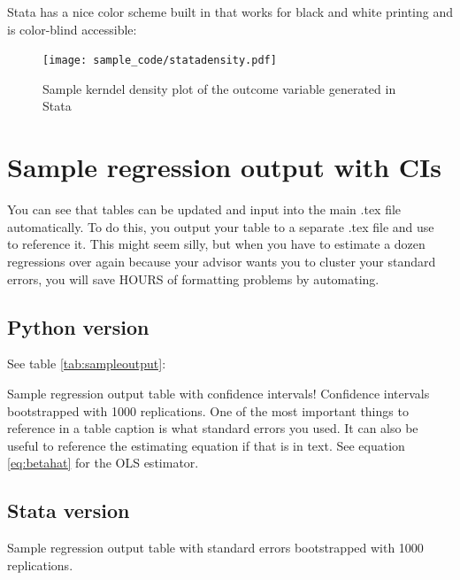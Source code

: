 \documentclass{article}
\begin{document}
Stata has a nice color scheme built in that works for black and white printing and is color-blind accessible:

\begin{figure}[ht]
    \centering
    \texttt{[image: sample\_code/statadensity.pdf]}
    \caption{Sample kerndel density plot of the outcome variable generated in Stata}
    \label{fig:statahist}
\end{figure}

\section{Sample regression output with CIs}
You can see that tables can be updated and input into the main .tex file automatically.  To do this, you output your table to a separate .tex file and use \verb!  ! to reference it.  This might seem silly, but when you have to estimate a dozen regressions over again because your advisor wants you to cluster your standard errors, you will save HOURS of formatting problems by automating.

\subsection{Python version}

See table \ref{tab:sampleoutput}:

\begin{table}[ht]
    \centering
    
    \caption{Sample regression output table with confidence intervals! Confidence intervals bootstrapped with 1000 replications.  One of the most important things to reference in a table caption is what standard errors you used.  It can also be useful to reference the estimating equation if that is in text. See equation \ref{eq:betahat} for the OLS estimator.}
    \label{tab:sampleoutput}
\end{table}

\subsection{Stata version}

\begin{table}[ht]
    \centering
    
    \caption{Sample regression output table with standard errors bootstrapped with 1000 replications.}
    \label{tab:regression_output}
\end{table}
\end{document}
